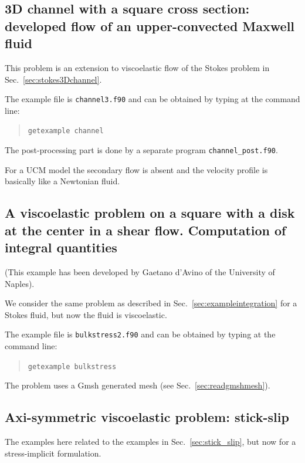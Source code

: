 \subsection{3D channel with a square cross section:
developed flow of an upper-convected Maxwell fluid}

This problem is an extension to viscoelastic flow of the Stokes problem in
Sec.~\ref{sec:stokes3Dchannel}.
                                                                                
The example file is \texttt{channel3.f90} and can be obtained by typing at the
command line:
\begin{quote}
   \texttt{getexample channel}
\end{quote}
The post-processing part is done by a separate program
\texttt{channel\_post.f90}.

For a UCM model the secondary flow is absent and the velocity profile is
basically like a Newtonian fluid.
                                                                                
\subsection{A viscoelastic problem on a square with a disk at the center in a shear flow.
 Computation of integral quantities}
\label{sec:exampleintegration_ve}

(This example has been developed by Gaetano d'Avino of the University of Naples).

We consider the same problem as described in Sec.~\ref{sec:exampleintegration} for a Stokes fluid, but now
the fluid is viscoelastic.

The example file is \texttt{bulkstress2.f90} and can be obtained by typing at the
command line:
\begin{quote}
   \texttt{getexample bulkstress}
\end{quote} 
The problem uses a Gmsh generated mesh 
(see Sec.~\ref{sec:readgmshmesh}).


\subsection{Axi-symmetric viscoelastic problem: stick-slip}
\label{sec:stick_slip_impl}

The examples here related to the examples in Sec.~\ref{sec:stick_slip}, but now for a 
stress-implicit formulation.

